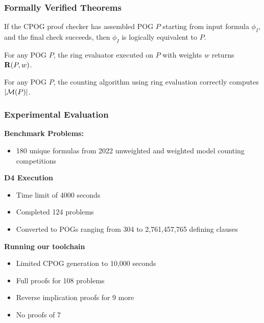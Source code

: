\documentclass[t,pdf]{beamer}
\begin{document}
\begin{frame}
  \frametitle{Formally Verified Theorems}
  \medskip

  \begin{theorem}
    If the CPOG proof checker has assembled POG $P$ starting from input formula $\phi_I$, and the final check succeeds, then $\phi_I$ is logically equivalent to $P$.
  \end{theorem}

  \begin{theorem}
    For any POG $P$, the ring evaluator executed on $P$ with weights $w$ returns ${\bf R}(P, w)$.
  \end{theorem}

  \begin{theorem}
    For any POG $P$, the counting algorithm using ring evaluation correctly computes $|{\cal M}(P)|$.
  \end{theorem}
\end{frame}


\begin{frame}
  \frametitle{Experimental Evaluation}

  {\bf Benchmark Problems:}
  \begin{itemize}
    \item 180 unique formulas from 2022 unweighted and weighted model counting competitions
  \end{itemize}

  \medskip

  {\bf D4 Execution}
  \begin{itemize}
  \item Time limit of 4000 seconds
  \item Completed 124 problems
  \item Converted to POGs ranging from 304 to 2,761,457,765 defining clauses
  \end{itemize}

  \medskip
  {\bf Running our toolchain}
  \begin{itemize}
    \item Limited CPOG generation to 10,000 seconds
    \item Full proofs for 108 problems
    \item Reverse implication proofs for 9 more
    \item No proofs of 7
  \end{itemize}

\end{frame}
\end{document}
